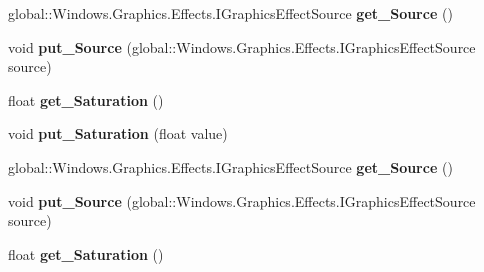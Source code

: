 \begin{DoxyCompactItemize}
global\+::\+Windows.\+Graphics.\+Effects.\+I\+Graphics\+Effect\+Source {\bfseries get\+\_\+\+Source} ()
\item 
\mbox{\label{interface_microsoft_1_1_graphics_1_1_canvas_1_1_effects_1_1_i_saturation_effect_abeab04d73cf460ffaf84e878855471bd}} 
void {\bfseries put\+\_\+\+Source} (global\+::\+Windows.\+Graphics.\+Effects.\+I\+Graphics\+Effect\+Source source)
\item 
\mbox{\label{interface_microsoft_1_1_graphics_1_1_canvas_1_1_effects_1_1_i_saturation_effect_adecdc3257dffa4b9d889b825dee8bcfc}} 
float {\bfseries get\+\_\+\+Saturation} ()
\item 
\mbox{\label{interface_microsoft_1_1_graphics_1_1_canvas_1_1_effects_1_1_i_saturation_effect_a336f2121ed8c5134bdfb2dfbff7e6dc5}} 
void {\bfseries put\+\_\+\+Saturation} (float value)
\item 
\mbox{\label{interface_microsoft_1_1_graphics_1_1_canvas_1_1_effects_1_1_i_saturation_effect_a6d046df767aa40e632f84f8898bab4ee}} 
global\+::\+Windows.\+Graphics.\+Effects.\+I\+Graphics\+Effect\+Source {\bfseries get\+\_\+\+Source} ()
\item 
\mbox{\label{interface_microsoft_1_1_graphics_1_1_canvas_1_1_effects_1_1_i_saturation_effect_abeab04d73cf460ffaf84e878855471bd}} 
void {\bfseries put\+\_\+\+Source} (global\+::\+Windows.\+Graphics.\+Effects.\+I\+Graphics\+Effect\+Source source)
\item 
\mbox{\label{interface_microsoft_1_1_graphics_1_1_canvas_1_1_effects_1_1_i_saturation_effect_adecdc3257dffa4b9d889b825dee8bcfc}} 
float {\bfseries get\+\_\+\+Saturation} ()
\item 
\mbox{\label{interface_microsoft_1_1_graphics_1_1_canvas_1_1_effects_1_1_i_saturation_effect_a336f2121ed8c5134bdfb2dfbff7e6dc5}} 

\end{DoxyCompactItemize}
